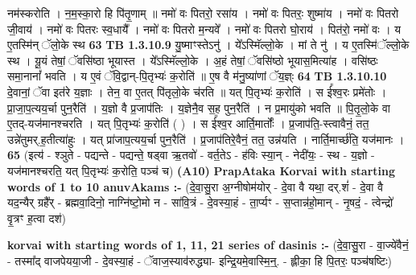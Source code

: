 \documentclass[17pt]{extarticle}
\begin{document}
                  नम॑स्करोति । न॒म॒स्का॒रो हि पि॑तृ॒णाम् ॥ नमो॑ वः पितरो॒ रसा॑य । नमो॑ वः पितरः॒ शुष्मा॑य । नमो॑ वः पितरो जी॒वाय॑ । नमो॑ वः पितरः स्व॒धायै᳚ । नमो॑ वः पितरो म॒न्यवे᳚ । नमो॑ वः पितरो घो॒राय॑ । पित॑रो॒ नमो॑ वः । य ए॒तस्मि॑न् ॅलो॒के स्थ \textbf{ 63} \newline
                  \newline
                                \textbf{ TB 1.3.10.9} \newline
                  यु॒ष्माꣳस्तेऽनु॑ । ये᳚ऽस्मिॅल्लो॒के । मां ते नु॑ । य ए॒तस्मि॑ॅल्लो॒के स्थ । यू॒यं तेषां॒ ॅवसि॑ष्ठा भूयास्त । ये᳚ऽस्मिॅल्लो॒के । अ॒हं तेषां॒ ॅवसि॑ष्ठो भूयास॒मित्या॑ह । वसि॑ष्ठः समा॒नानां᳚ भवति । य ए॒वं ॅवि॒द्वान्-पि॒तृभ्यः॑ क॒रोति॑ ॥ ए॒ष वै म॑नु॒ष्या॑णां ॅय॒ज्ञ्ः \textbf{ 64} \newline
                  \newline
                                \textbf{ TB 1.3.10.10} \newline
                  दे॒वानां॒ ॅवा इत॑रे य॒ज्ञाः । तेन॒ वा ए॒तत् पि॑तृलो॒के च॑रति ॥ यत् पि॒तृभ्यः॑ क॒रोति॑ । स ई᳚श्व॒रः प्रमे॑तोः । प्रा॒जा॒प॒त्यय॒र्चा पुन॒रैति॑ । य॒ज्ञो वै प्र॒जाप॑तिः । य॒ज्ञेनै॒व स॒ह पुन॒रैति॑ । न प्र॒मायु॑को भवति ॥ पि॒तृ॒लो॒के वा ए॒तद्-यज॑मानश्चरति । यत् पि॒तृभ्यः॑ क॒रोति॑ ( ) । स ई᳚श्व॒र आर्ति॒मार्तोः᳚ । प्र॒जाप॑ति॒-स्त्वावैनं॒ तत॒ उन्ने॑तुमर्.ह॒तीत्या॑हुः । यत् प्रा॑जाप॒त्यय॒र्चा पुन॒रैति॑ । प्र॒जाप॑तिरे॒वैनं॒ तत॒ उन्न॑यति । नार्ति॒मार्च्छ॑ति॒ यज॑मानः । \textbf{ 65} \newline
                  \newline
                                    (इत्य॑ - श्ञुते - पद्यन्ते - पद्यन्ते॒ षड्वा ऋ॒तवो॑ - वर्त॒तेऽ - ह॑विः स्या॒न् - नेदी॑यः॒ - स्थ - य॒ज्ञो - यज॑मानश्चरति॒ यत् पि॒तृभ्यः॑ क॒रोति॒ पञ्च॑ च) \textbf{(A10)} \newline \newline
                \textbf{PrapAtaka Korvai with starting  words of 1 to 10 anuvAkams :-} \newline
        (दे॒वा॒सु॒रा अ॒ग्नीषोम॑योर् - दे॒वा वै यथा॒ दर्.शं॑ - दे॒वा वै यद॒न्यैर् ग्रहै᳚र् - ब्रह्मवा॒दिनो॒ नाग्नि॑ष्टो॒मो न - सा॑वि॒त्रं - दे॒वस्या॒हं - ता॒र्प्यꣳ - स॒प्तान्न॑हो॒मान् - नृ॒षदं॒ - त्वेन्द्रो॑ वृ॒त्रꣳ ह॒त्वा दश॑) \newline

        \textbf{korvai with starting words of 1, 11, 21 series of dasinis :-} \newline
        (दे॒वा॒सु॒रा - वा॒ज्ये॑वैनं॒ - तस्मा᳚द् वाजपेयया॒जी - दे॒वस्या॒हं - ॅवाज॒स्याव॑रुद्ध्या- इन्द्रि॒यमे॒वास्मि॒न्॒. - ह्लीका॒ हि पि॒तरः॒ पञ्च॑षष्टिः) \newline
\end{document}
